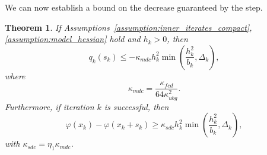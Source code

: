 \documentclass{article}
\numberwithin{equation}{section}
\theoremstyle{plain}
\newtheorem{theorem}{Theorem}
\begin{document}
	We can now establish a bound on the decrease guaranteed by the step.
	\begin{theorem}
		If Assumptions~\ref{assumption:inner_iterates_compact}, \ref{assumption:model_hessian} hold and $h_k > 0$, then
		\begin{equation}\label{eq:bound_step_decrease}
			q_k(s_k) \le -\kappa_{mdc} h_k^2 \min\left(\dfrac{h_k^2}{b_k},\Delta_k\right),
		\end{equation}
		where 
		\begin{equation*}
			\kappa_{mdc} = \dfrac{\kappa_{fcd}}{64\kappa_{ubg}^2}.
		\end{equation*}
		Furthermore, if iteration $k$ is successful, then
		\begin{equation}\label{eq:bound_successful_step_decrease}
			\varphi(x_k) - \varphi(x_k+s_k) \ge \kappa_{sdc} h_k^2 \min\left(\dfrac{h_k^2}{b_k},\Delta_k\right),
		\end{equation}
		with $\kappa_{sdc} = \eta_1 \kappa_{mdc}$.
	\end{theorem} 
\end{document}
